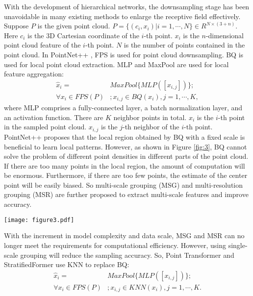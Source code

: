 \documentclass[10pt,twocolumn,letterpaper]{article}
\begin{document}
        With the development of hierarchical networks, the downsampling stage has been unavoidable in many existing methods to enlarge the receptive field effectively. Suppose $P$ is the given point cloud. $P = \{ ({c_i},{x_i}) \vert i = 1,\cdots,N\}  \in {R^{N \times (3 + n)}}$. Here ${c_i}$ is the 3D Cartesian coordinate of the $i$-th point. ${x_i}$ is the $n$-dimensional point cloud feature of the $i$-th point. $N$ is the number of points contained in the point cloud. In PointNet++ \cite{13Charles_2017}, FPS is used for point cloud downsampling. BQ is used for local point cloud extraction. MLP and MaxPool are used for local feature aggregation:
        \begin{equation}
        \begin{aligned}
        {\hat x_{i}} = &MaxPool\{ MLP\left( {[{x_{i,j}}]} \right)\} ; \\ \forall {x_i} \in FPS\left( P \right)&; {x_{i,j}} \in BQ\left( {{x_i}} \right),j = 1, \cdots ,K,
        \end{aligned}
        \end{equation}
        where MLP comprises a fully-connected layer, a batch normalization layer, and an activation function. There are $K$ neighbor points in total. ${x_i}$ is the $i$-th point in the sampled point cloud. ${x_{i,j}}$ is the $j$-th neighbor of the $i$-th point. PointNet++ \cite{13Charles_2017} proposes that the local region obtained by BQ with a fixed scale is beneficial to learn local patterns. However, as shown in Figure \ref{fig:3}, BQ cannot solve the problem of different point densities in different parts of the point cloud. If there are too many points in the local region, the amount of computation will be enormous. Furthermore, if there are too few points, the estimate of the center point will be easily biased. So multi-scale grouping (MSG) and multi-resolution grouping (MSR) are further proposed to extract multi-scale features and improve accuracy.
        \begin{figure*}[!htb]
        \centering
        \texttt{[image: figure3.pdf]}
        \caption{Different parts with different point densities have a different number of neighbor points with BQ on a fixed scale. (a) The BQ method will produce more neighbor points in high-density parts. (b) If the density is too low, there will be fewer, even no, points in the local region.}
        \label{fig:3}
        \end{figure*}

        With the increment in model complexity and data scale, MSG and MSR can no longer meet the requirements for computational efficiency. However, using single-scale grouping will reduce the sampling accuracy. So, Point Transformer \cite{24Zhao_2021} and StratifiedFormer \cite{44qq} use KNN to replace BQ:
        \begin{equation}
        \begin{aligned}
        {\hat x_{i}} = &MaxPool\{ MLP\left( {[{x_{i,j}}]} \right)\} ; \\ \forall {x_i} \in FPS\left( P \right)&;{x_{i,j}} \in KNN\left( {{x_i}} \right),j = 1, \cdots ,K.
        \end{aligned}
        \end{equation}
\end{document}
